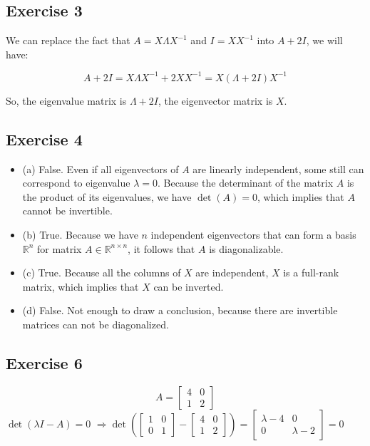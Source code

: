 \documentclass{article}
\begin{document}
\subsection{Exercise 3}

We can replace the fact that \( A = X \Lambda X^{-1} \) and \( I = X X^{-1} \) into \( A + 2I \), we will have:

\[
    A + 2I = X \Lambda X^{-1} + 2 X X^{-1}
    = X (\Lambda + 2I) X^{-1}
\]

So, the eigenvalue matrix is \( \Lambda + 2I \), the eigenvector matrix is \( X \).

\subsection{Exercise 4}
\begin{itemize}
    \item (a) False. Even if all eigenvectors of \(A\) are linearly independent, some still can correspond to eigenvalue \(\lambda = 0\). Because the determinant of the matrix \(A\) is the product of its eigenvalues, we have \(\det(A) = 0\), which implies that \(A\) cannot be invertible.
    \item (b) True. Because we have \(n\) independent eigenvectors that can form a basis \(\mathbb{R}^n\) for matrix \(A \in \mathbb{R}^{n \times n}\), it follows that \(A\) is diagonalizable.
    \item (c) True. Because all the columns of \(X\) are independent, \(X\) is a full-rank matrix, which implies that \(X\) can be inverted.
    \item (d) False. Not enough to draw a conclusion, because there are invertible matrices can not be diagonalized.
\end{itemize}

\subsection{Exercise 6}
\[
    A=
    \begin{bmatrix}
        4 & 0 \\
        1 & 2
    \end{bmatrix}
\]
$\det(\lambda I-A) = 0$
$\Rightarrow \det\left(
    \begin{bmatrix}
            1 & 0 \\
            0 & 1
        \end{bmatrix} -
    \begin{bmatrix}
            4 & 0 \\
            1 & 2
        \end{bmatrix}\right) =
    \begin{bmatrix}
        \lambda - 4 & 0          \\
        0           & \lambda -2
    \end{bmatrix} = 0$
\end{document}
